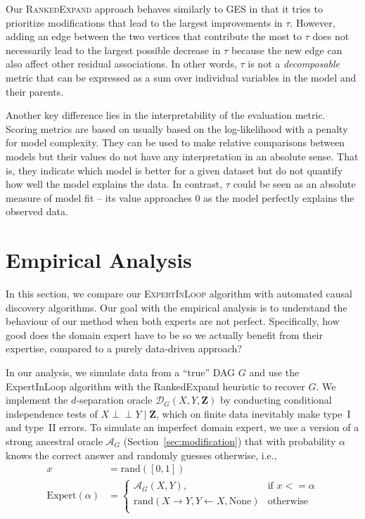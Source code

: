 \documentclass[accepted]{uai2025} %
\def\ci{\perp\!\!\!\!\perp}
\begin{document}
Our \textsc{RankedExpand} approach behaves similarly to GES in that it 
tries to prioritize modifications that lead to the largest improvements 
in $\tau$. However, adding an edge between the two vertices that contribute
the most to $\tau$ does not necessarily lead to the largest 
possible decrease in $\tau$ because the new edge can also affect other 
residual associations. In other words, $\tau$ is not a \emph{decomposable}
metric that can be expressed as a sum over individual variables in the model
and their parents. 

Another key difference lies in the interpretability of the evaluation metric.
Scoring metrics are based on usually based on the log-likelihood with a penalty
for model complexity. They can be used to make relative comparisons between
models but their values do not have any interpretation in an absolute sense.
That is, they indicate which model is better for a given dataset but do not
quantify how well the model explains the data. In
contrast, $ \tau $ could be seen as an absolute measure of model fit -- 
its value approaches $ 0 $ as the model perfectly explains the observed data.

\section{Empirical Analysis}
\label{sec:empirical}

In this section, we compare our \textsc{ExpertInLoop} algorithm with automated
causal discovery algorithms. Our goal with the empirical analysis is to
understand the behaviour of our method when both experts are not perfect.
Specifically, how good does the domain expert have to be so we actually benefit
from their expertise, compared to a purely data-driven approach? 

In our analysis, we simulate data from a ``true'' DAG $G$ and use the
{\sc ExpertInLoop} algorithm with the {\sc RankedExpand} heuristic 
to recover $G$. We implement the $d$-separation oracle $\mathcal{D}_G(X,Y,\mathbf{Z})$
by conducting conditional independence tests of $X \ci Y \mid \mathbf{Z}$, which on finite
data inevitably make type~I and type~II errors. To
simulate an imperfect domain expert, we use a version of a strong 
ancestral oracle $\mathcal{A}_G$ (Section~\ref{sec:modification})
that with probability $\alpha$ knows the correct answer and randomly
guesses otherwise, i.e.,
\begin{equation*}
	\begin{split}
		x &= \textrm{rand}([0, 1]) \\
		\mathrm{Expert}(\alpha) &= \begin{cases} 
			\mathcal{A}_G(X, Y),  & \textrm{if  } x <= \alpha \\
			\textrm{rand}(X \rightarrow Y, Y \leftarrow X, \textrm{None}) & \textrm{otherwise} \\
				\end{cases} 
	\end{split}
\end{equation*}
\end{document}
